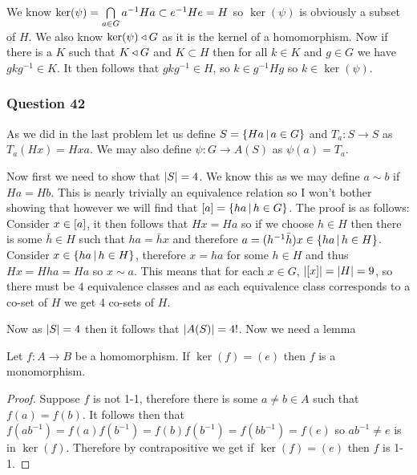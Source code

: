 \documentclass{article}
\begin{document}
 We know $\ker(\psi) = \bigcap\limits_{a \in G}^{}  {a^{-1}Ha}  \subset e^{-1}He = H$ so $\ker(\psi)$ is obviously a subset of $H$. We also know $\ker(\psi) \triangleleft G$ as it is the kernel of a homomorphism. Now if there is a $K$ such that $K \triangleleft G$ and $K\subset H$ then for all $k \in K$ and $g \in G$ we have $gkg^{-1} \in K$. It then follows that $gkg^{-1} \in H$, so $k \in g^{-1}Hg$ so $k \in\ker(\psi)$.

\subsubsection{Question 42}

As we did in the last problem let us define $S =\left\{{Ha} \,\middle|\, {a \in G}\right\}$ and $T_a:S\to S$ as $T_a(Hx) = Hxa$. We may also define $\psi:G\to A(S)$ as $\psi(a) = T_a$.

Now first we need to show that $\left| {S} \right| = 4$. We know this as we may define $a\sim b$ if $Ha = Hb$. This is nearly trivially an equivalence relation so I won't bother showing that however we will find that $\left[{a}\right] = \left\{{ha} \,\middle|\, {h\in G}\right\}$. The proof is as follows: Consider $x \in \left[{a}\right]$, it then follows that $Hx = Ha$ so if we choose $h \in H$ then there is some $\bar h \in H$ such that $ha = \bar hx$ and therefore $a = (h^{-1}\bar h)x \in \left\{{ha} \,\middle|\, {h \in H}\right\}$. Consider $x \in \left\{{ha} \,\middle|\, {h \in H}\right\}$, therefore $x = ha$ for some $h\in H$ and thus $Hx = Hha = Ha$ so $x \sim a$. This means that for each $x \in G$, $\left| {\left[{x}\right]} \right| = \left| {H} \right| = 9$, so there must be $4$ equivalence classes and as each equivalence class corresponds to a co-set of $H$ we get 4 co-sets of $H$.

Now as $\left| {S} \right| = 4$ then it follows that $\left| {A(S)} \right| = 4!$. Now we need a lemma

\begin{lemma}
	Let $f:A\to B$ be a homomorphism. If $\ker(f) = (e)$ then $f$ is a monomorphism.
\end{lemma}
\begin{proof}
	Suppose $f$ is not 1-1, therefore there is some $a\not=b \in A$ such that $f(a) = f(b)$. It follows then that $f(ab^{-1}) = f(a)f(b^{-1}) = f(b)f(b^{-1}) = f(bb^{-1}) = f(e)$ so $ab^{-1}\not=e$ is in $\ker(f)$. Therefore by contrapositive we get if $\ker(f) = (e)$ then $f$ is 1-1. 
\end{proof}
\end{document}
